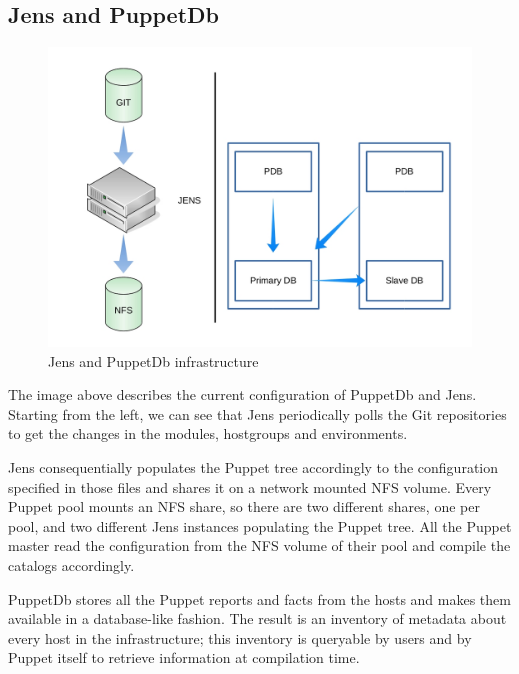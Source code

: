 
\subsection{Jens and PuppetDb}

\begin{figure}[H]
\includegraphics[width=\textwidth,height=\textheight,keepaspectratio]{ConfigurationManagement/Infrastructure_jens_pdb.jpg}
\caption{Jens and PuppetDb infrastructure}
\end{figure}

The image above describes the current configuration of PuppetDb and Jens.
Starting from the left, we can see that Jens periodically polls the Git
repositories to get the changes in the modules, hostgroups and
environments.

Jens consequentially populates the Puppet tree accordingly to the
configuration specified in those files and shares it on a network mounted
NFS volume. Every Puppet pool mounts an NFS share, so there are two
different shares, one per pool, and two different Jens instances
populating the Puppet tree. All the Puppet master read the configuration
from the NFS volume of their pool and compile the catalogs accordingly.

PuppetDb stores all the Puppet reports and facts from the hosts and makes
them available in a database-like fashion. The result is an inventory of
metadata about every host in the infrastructure; this inventory is
queryable by users and by Puppet itself to retrieve information at
compilation time.
